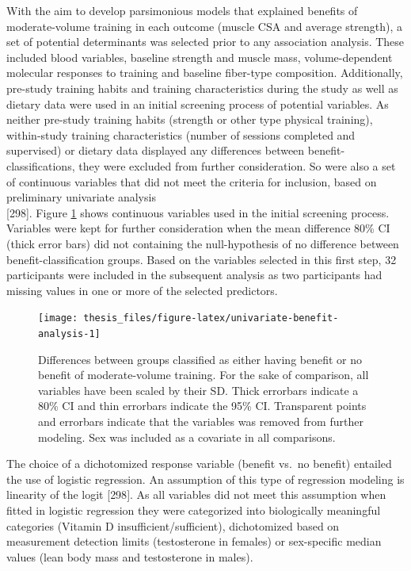 \documentclass[twoside,10pt]{gihclass} %
\begin{document}
With the aim to develop parsimonious models that explained benefits of moderate-volume training in each outcome (muscle CSA and average strength), a set of potential determinants was selected prior to any association analysis. These included blood variables, baseline strength and muscle mass, volume-dependent molecular responses to training and baseline fiber-type composition. Additionally, pre-study training habits and training characteristics during the study as well as dietary data were used in an initial screening process of potential variables. As neither pre-study training habits (strength or other type physical training), within-study training characteristics (number of sessions completed and supervised) or dietary data displayed any differences between benefit-classifications, they were excluded from further consideration. So were also a set of continuous variables that did not meet the criteria for inclusion, based on preliminary univariate analysis\\
{[}298{]}.
Figure \ref{fig:univariate-benefit-analysis} shows continuous variables used in the initial screening process. Variables were kept for further consideration when the mean difference 80\% CI (thick error bars) did not containing the null-hypothesis of no difference between benefit-classification groups. Based on the variables selected in this first step, 32 participants were included in the subsequent analysis as two participants had missing values in one or more of the selected predictors.
\begin{figure}

{\centering \texttt{[image: thesis\_files/figure-latex/univariate-benefit-analysis-1]} 

}

\caption[Univariate analysis of potential determinants of benefit to moderat- over low-volume training]{Differences between groups classified as either having benefit or no benefit of moderate-volume training. For the sake of comparison, all variables have been scaled by their SD. Thick errorbars indicate a 80\% CI and thin errorbars indicate the 95\% CI. Transparent points and errorbars indicate that the variables was removed from further modeling. Sex was included as a covariate in all comparisons.}\label{fig:univariate-benefit-analysis}
\end{figure}
The choice of a dichotomized response variable (benefit vs.~no benefit) entailed the use of logistic regression. An assumption of this type of regression modeling is linearity of the logit
{[}298{]}.
As all variables did not meet this assumption when fitted in logistic regression they were categorized into biologically meaningful categories (Vitamin D insufficient/sufficient), dichotomized based on measurement detection limits (testosterone in females) or sex-specific median values (lean body mass and testosterone in males).
\end{document}
